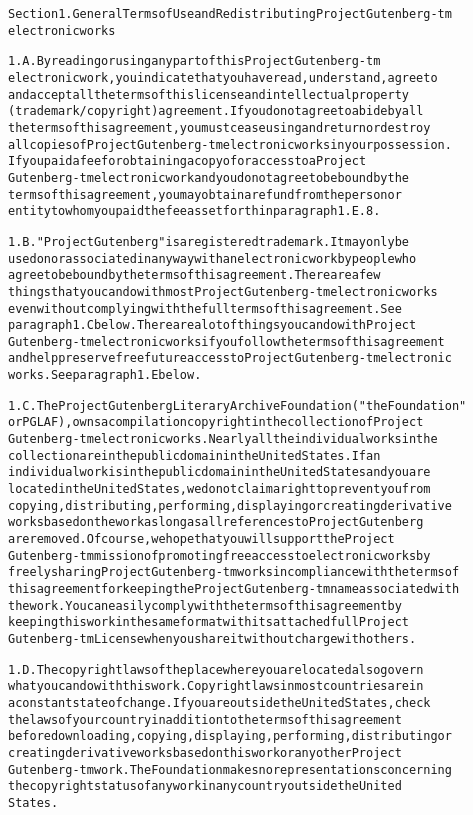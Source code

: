 \documentclass[12pt,leqno]{book}[2005/09/16]
\newenvironment{PGtext}{%
\begin{alltt}
\fontsize{8.1}{10}\ttfamily\selectfont}%
{\end{alltt}}
\begin{document}
\begin{PGtext}
Section 1.  General Terms of Use and Redistributing Project Gutenberg-tm
electronic works

1.A.  By reading or using any part of this Project Gutenberg-tm
electronic work, you indicate that you have read, understand, agree to
and accept all the terms of this license and intellectual property
(trademark/copyright) agreement.  If you do not agree to abide by all
the terms of this agreement, you must cease using and return or destroy
all copies of Project Gutenberg-tm electronic works in your possession.
If you paid a fee for obtaining a copy of or access to a Project
Gutenberg-tm electronic work and you do not agree to be bound by the
terms of this agreement, you may obtain a refund from the person or
entity to whom you paid the fee as set forth in paragraph 1.E.8.

1.B.  "Project Gutenberg" is a registered trademark.  It may only be
used on or associated in any way with an electronic work by people who
agree to be bound by the terms of this agreement.  There are a few
things that you can do with most Project Gutenberg-tm electronic works
even without complying with the full terms of this agreement.  See
paragraph 1.C below.  There are a lot of things you can do with Project
Gutenberg-tm electronic works if you follow the terms of this agreement
and help preserve free future access to Project Gutenberg-tm electronic
works.  See paragraph 1.E below.

1.C.  The Project Gutenberg Literary Archive Foundation ("the Foundation"
or PGLAF), owns a compilation copyright in the collection of Project
Gutenberg-tm electronic works.  Nearly all the individual works in the
collection are in the public domain in the United States.  If an
individual work is in the public domain in the United States and you are
located in the United States, we do not claim a right to prevent you from
copying, distributing, performing, displaying or creating derivative
works based on the work as long as all references to Project Gutenberg
are removed.  Of course, we hope that you will support the Project
Gutenberg-tm mission of promoting free access to electronic works by
freely sharing Project Gutenberg-tm works in compliance with the terms of
this agreement for keeping the Project Gutenberg-tm name associated with
the work.  You can easily comply with the terms of this agreement by
keeping this work in the same format with its attached full Project
Gutenberg-tm License when you share it without charge with others.

1.D.  The copyright laws of the place where you are located also govern
what you can do with this work.  Copyright laws in most countries are in
a constant state of change.  If you are outside the United States, check
the laws of your country in addition to the terms of this agreement
before downloading, copying, displaying, performing, distributing or
creating derivative works based on this work or any other Project
Gutenberg-tm work.  The Foundation makes no representations concerning
the copyright status of any work in any country outside the United
States.


\end{PGtext}
\end{document}
